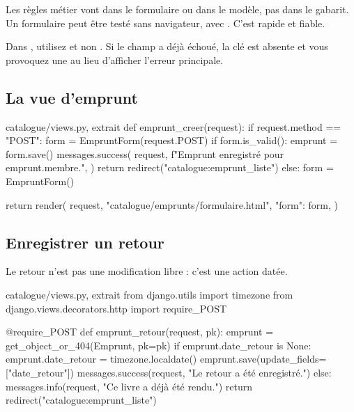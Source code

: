 \begin{bonne}
Les règles métier vont dans le formulaire ou dans le modèle, pas dans le gabarit.
Un formulaire peut être testé sans navigateur, avec
. C'est rapide et fiable.
\end{bonne}

\begin{piege}
Dans , utilisez  et non
. Si le champ a déjà échoué, la clé est absente et vous
provoquez une  au lieu d'afficher l'erreur principale.
\end{piege}

\subsection{La vue d'emprunt}

\begin{codebox}[python]{catalogue/views.py, extrait}
def emprunt_creer(request):
    if request.method == "POST":
        form = EmpruntForm(request.POST)
        if form.is_valid():
            emprunt = form.save()
            messages.success(
                request,
                f"Emprunt enregistré pour {emprunt.membre}.",
            )
            return redirect("catalogue:emprunt_liste")
    else:
        form = EmpruntForm()

    return render(
        request,
        "catalogue/emprunts/formulaire.html",
        {"form": form},
    )
\end{codebox}

\subsection{Enregistrer un retour}

Le retour n'est pas une modification libre : c'est une action datée.

\begin{codebox}[python]{catalogue/views.py, extrait}
from django.utils import timezone
from django.views.decorators.http import require_POST


@require_POST
def emprunt_retour(request, pk):
    emprunt = get_object_or_404(Emprunt, pk=pk)
    if emprunt.date_retour is None:
        emprunt.date_retour = timezone.localdate()
        emprunt.save(update_fields=["date_retour"])
        messages.success(request, "Le retour a été enregistré.")
    else:
        messages.info(request, "Ce livre a déjà été rendu.")
    return redirect("catalogue:emprunt_liste")
\end{codebox}

